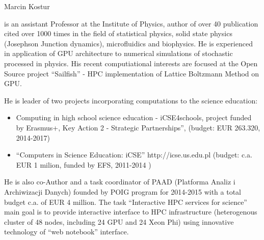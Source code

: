 \begin{participant}[PM=12,salary=1500]{Marcin Kostur}

is an assistant Professor at the Institute of Physics, author of  over 40
publication cited over 1000 times in the field of statistical physics,
solid state physics (Josephson Junction dynamics), microfluidics and
biophysics. He is experienced in application of GPU architecture to
numerical simulations of stochastic processed in physics. His recent
computiational interests are focused at the Open Source project
``Sailfish'' - HPC implementation of Lattice Boltzmann Method on GPU.

He is leader of two projects incorporating computations to the science education:

\begin{itemize}
\item Computing in high school science education - iCSE4schools,
  project funded by Erasmus+, Key Action 2 - Strategic Partnerships'',
  (budget: EUR 263.320, 2014-2017)
\item ``Computers in Science Education: iCSE'' http://icse.us.edu.pl
  (budget: c.a. EUR 1 milion, funded by EFS, 2011-2014 )
\end{itemize}

He is also co-Author and a task coordinator of PAAD (Platforma Analiz i
Archiwizacji Danych) founded by POIG program for 2014-2015 with a total budget
c.a. of EUR 4 million. The task ``Interactive HPC services for science''
main goal is to provide interactive interface to HPC infrastructure
(heterogenous cluster of 48 nodes, including 24 GPU and 24 Xeon Phi)
using innovative technology of ``web notebook'' interface.  




\end{participant}
